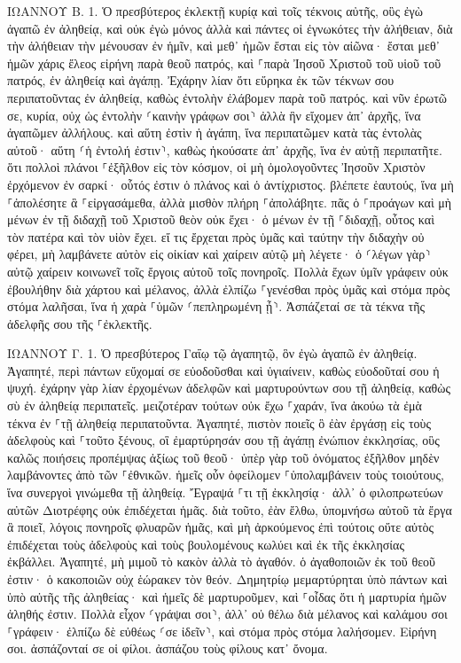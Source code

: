 \documentclass[twoside, 9pt]{extreport}
\begin{document}
ΙΩΑΝΝΟΥ Β.
1.
Ὁ πρεσβύτερος ἐκλεκτῇ κυρίᾳ καὶ τοῖς τέκνοις αὐτῆς, οὓς ἐγὼ ἀγαπῶ ἐν ἀληθείᾳ, καὶ οὐκ ἐγὼ μόνος ἀλλὰ καὶ πάντες οἱ ἐγνωκότες τὴν ἀλήθειαν, 
διὰ τὴν ἀλήθειαν τὴν μένουσαν ἐν ἡμῖν, καὶ μεθ᾽ ἡμῶν ἔσται εἰς τὸν αἰῶνα· 
ἔσται μεθ᾽ ἡμῶν χάρις ἔλεος εἰρήνη παρὰ θεοῦ πατρός, καὶ ⸀παρὰ Ἰησοῦ Χριστοῦ τοῦ υἱοῦ τοῦ πατρός, ἐν ἀληθείᾳ καὶ ἀγάπῃ. 
Ἐχάρην λίαν ὅτι εὕρηκα ἐκ τῶν τέκνων σου περιπατοῦντας ἐν ἀληθείᾳ, καθὼς ἐντολὴν ἐλάβομεν παρὰ τοῦ πατρός. 
καὶ νῦν ἐρωτῶ σε, κυρία, οὐχ ὡς ἐντολὴν ⸂καινὴν γράφων σοι⸃ ἀλλὰ ἣν εἴχομεν ἀπ᾽ ἀρχῆς, ἵνα ἀγαπῶμεν ἀλλήλους. 
καὶ αὕτη ἐστὶν ἡ ἀγάπη, ἵνα περιπατῶμεν κατὰ τὰς ἐντολὰς αὐτοῦ· αὕτη ⸂ἡ ἐντολή ἐστιν⸃, καθὼς ἠκούσατε ἀπ᾽ ἀρχῆς, ἵνα ἐν αὐτῇ περιπατῆτε. 
ὅτι πολλοὶ πλάνοι ⸀ἐξῆλθον εἰς τὸν κόσμον, οἱ μὴ ὁμολογοῦντες Ἰησοῦν Χριστὸν ἐρχόμενον ἐν σαρκί· οὗτός ἐστιν ὁ πλάνος καὶ ὁ ἀντίχριστος. 
βλέπετε ἑαυτούς, ἵνα μὴ ⸀ἀπολέσητε ἃ ⸀εἰργασάμεθα, ἀλλὰ μισθὸν πλήρη ⸀ἀπολάβητε. 
πᾶς ὁ ⸀προάγων καὶ μὴ μένων ἐν τῇ διδαχῇ τοῦ Χριστοῦ θεὸν οὐκ ἔχει· ὁ μένων ἐν τῇ ⸀διδαχῇ, οὗτος καὶ τὸν πατέρα καὶ τὸν υἱὸν ἔχει. 
εἴ τις ἔρχεται πρὸς ὑμᾶς καὶ ταύτην τὴν διδαχὴν οὐ φέρει, μὴ λαμβάνετε αὐτὸν εἰς οἰκίαν καὶ χαίρειν αὐτῷ μὴ λέγετε· 
ὁ ⸂λέγων γὰρ⸃ αὐτῷ χαίρειν κοινωνεῖ τοῖς ἔργοις αὐτοῦ τοῖς πονηροῖς. 
Πολλὰ ἔχων ὑμῖν γράφειν οὐκ ἐβουλήθην διὰ χάρτου καὶ μέλανος, ἀλλὰ ἐλπίζω ⸀γενέσθαι πρὸς ὑμᾶς καὶ στόμα πρὸς στόμα λαλῆσαι, ἵνα ἡ χαρὰ ⸀ὑμῶν ⸂πεπληρωμένη ᾖ⸃. 
Ἀσπάζεταί σε τὰ τέκνα τῆς ἀδελφῆς σου τῆς ⸀ἐκλεκτῆς. 

ΙΩΑΝΝΟΥ Γ.
1.
Ὁ πρεσβύτερος Γαΐῳ τῷ ἀγαπητῷ, ὃν ἐγὼ ἀγαπῶ ἐν ἀληθείᾳ. 
Ἀγαπητέ, περὶ πάντων εὔχομαί σε εὐοδοῦσθαι καὶ ὑγιαίνειν, καθὼς εὐοδοῦταί σου ἡ ψυχή. 
ἐχάρην γὰρ λίαν ἐρχομένων ἀδελφῶν καὶ μαρτυρούντων σου τῇ ἀληθείᾳ, καθὼς σὺ ἐν ἀληθείᾳ περιπατεῖς. 
μειζοτέραν τούτων οὐκ ἔχω ⸀χαράν, ἵνα ἀκούω τὰ ἐμὰ τέκνα ἐν ⸀τῇ ἀληθείᾳ περιπατοῦντα. 
Ἀγαπητέ, πιστὸν ποιεῖς ὃ ἐὰν ἐργάσῃ εἰς τοὺς ἀδελφοὺς καὶ ⸀τοῦτο ξένους, 
οἳ ἐμαρτύρησάν σου τῇ ἀγάπῃ ἐνώπιον ἐκκλησίας, οὓς καλῶς ποιήσεις προπέμψας ἀξίως τοῦ θεοῦ· 
ὑπὲρ γὰρ τοῦ ὀνόματος ἐξῆλθον μηδὲν λαμβάνοντες ἀπὸ τῶν ⸀ἐθνικῶν. 
ἡμεῖς οὖν ὀφείλομεν ⸀ὑπολαμβάνειν τοὺς τοιούτους, ἵνα συνεργοὶ γινώμεθα τῇ ἀληθείᾳ. 
Ἔγραψά ⸀τι τῇ ἐκκλησίᾳ· ἀλλ᾽ ὁ φιλοπρωτεύων αὐτῶν Διοτρέφης οὐκ ἐπιδέχεται ἡμᾶς. 
διὰ τοῦτο, ἐὰν ἔλθω, ὑπομνήσω αὐτοῦ τὰ ἔργα ἃ ποιεῖ, λόγοις πονηροῖς φλυαρῶν ἡμᾶς, καὶ μὴ ἀρκούμενος ἐπὶ τούτοις οὔτε αὐτὸς ἐπιδέχεται τοὺς ἀδελφοὺς καὶ τοὺς βουλομένους κωλύει καὶ ἐκ τῆς ἐκκλησίας ἐκβάλλει. 
Ἀγαπητέ, μὴ μιμοῦ τὸ κακὸν ἀλλὰ τὸ ἀγαθόν. ὁ ἀγαθοποιῶν ἐκ τοῦ θεοῦ ἐστιν· ὁ κακοποιῶν οὐχ ἑώρακεν τὸν θεόν. 
Δημητρίῳ μεμαρτύρηται ὑπὸ πάντων καὶ ὑπὸ αὐτῆς τῆς ἀληθείας· καὶ ἡμεῖς δὲ μαρτυροῦμεν, καὶ ⸀οἶδας ὅτι ἡ μαρτυρία ἡμῶν ἀληθής ἐστιν. 
Πολλὰ εἶχον ⸂γράψαι σοι⸃, ἀλλ᾽ οὐ θέλω διὰ μέλανος καὶ καλάμου σοι ⸀γράφειν· 
ἐλπίζω δὲ εὐθέως ⸂σε ἰδεῖν⸃, καὶ στόμα πρὸς στόμα λαλήσομεν. 
Εἰρήνη σοι. ἀσπάζονταί σε οἱ φίλοι. ἀσπάζου τοὺς φίλους κατ᾽ ὄνομα. 
\end{document}
